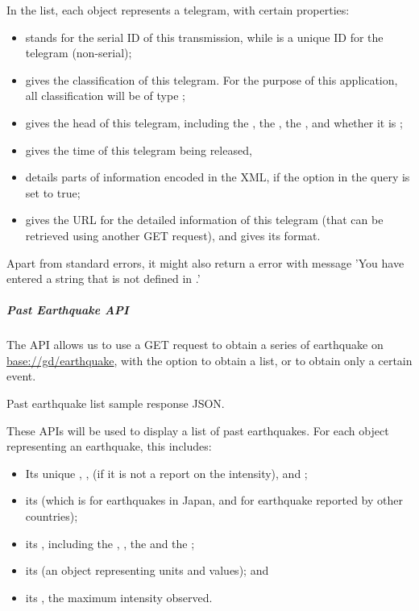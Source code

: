 In the  list, each object represents a telegram, with certain properties:
\begin{itemize}
    \item {} stands for the serial ID of this transmission, while  is a unique ID for the telegram (non-serial);
    \item {} gives the classification of this telegram. For the purpose of this application, all classification will be of type ;
    \item {} gives the head of this telegram, including the , the , the , and whether it is ;
    \item {} gives the time of this telegram being released,
    \item {} details parts of information encoded in the XML, if the  option in the query is set to true;
    \item {} gives the URL for the detailed information of this telegram (that can be retrieved using another GET request), and  gives its format.
\end{itemize}

Apart from standard errors, it might also return a  error with message 'You have entered a string that is not defined in .'

\subparagraph{Past Earthquake API}

The API  allows us to use a GET request to obtain a series of earthquake on \url{base://gd/earthquake}, with the option to obtain a list, or to obtain only a certain event.

\begin{listing}[!ht]
    \caption{Past earthquake list sample response JSON.}
    \label{alg:earthquake-list}
\end{listing}

These APIs will be used to display a list of past earthquakes. For each object representing an earthquake, this includes:
\begin{itemize}
    \item Its unique , ,  (if it is not a report on the intensity), and ;
    \item its  (which is  for earthquakes in Japan, and  for earthquake reported by other countries);
    \item its , including the , , the  and the ;
    \item its  (an object representing units and values); and
    \item its , the maximum intensity observed.
\end{itemize}

